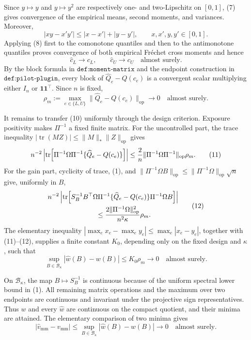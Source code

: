 Since \(y\mapsto y\) and \(y\mapsto y^2\) are respectively one- and two-Lipschitz on \([0,1]\), (7) gives convergence of the empirical means, second moments, and variances.  Moreover,
\[
|xy-x'y'|\le |x-x'|+|y-y'|,
\qquad x,x',y,y'\in[0,1].
\tag{8}
\]
Applying (8) first to the comonotone quantiles and then to the antimonotone quantiles proves convergence of both empirical Fr\'echet cross moments and hence
\[
\widehat c_L\to c_L,
\qquad
\widehat c_U\to c_U
\quad\text{almost surely}.
\tag{9}
\]
By the block formula in \(\texttt{def:moment-matrix}\) and the endpoint construction in \(\texttt{def:pilot-plugin}\), every block of \(\widehat Q_e-Q(c_e)\) is a convergent scalar multiplying either \(I_n\) or \(\mathbf 1\mathbf 1^{\top}\).  Since \(n\) is fixed,
\[
\rho_m:=\max_{e\in\{L,U\}}
\lVert\widehat Q_e-Q(c_e)\rVert_{\mathrm{op}}\longrightarrow0
\quad\text{almost surely}.
\tag{10}
\]

It remains to transfer (10) uniformly through the design criterion.  Exposure positivity makes \(\Pi^{-1}\) a fixed finite matrix.  For the uncontrolled part, the trace inequality \(|\operatorname{tr}(MZ)|\le\lVert M\rVert_*\lVert Z\rVert_{\mathrm{op}}\) gives
\[
n^{-2}\left|
\operatorname{tr}\!\left[\Pi^{-1}\Omega\Pi^{-1}
\{\widehat Q_e-Q(c_e)\}\right]\right|
\le {2\over n}\lVert\Pi^{-1}\Omega\Pi^{-1}\rVert_{\mathrm{op}}\rho_m.
\tag{11}
\]
For the gain part, cyclicity of trace, (1), and
\(\lVert\Pi^{-1}\Omega B\rVert_{\mathrm{op}}\le
\lVert\Pi^{-1}\Omega\rVert_{\mathrm{op}}\sqrt n\) give, uniformly in \(B\),
\[
\begin{split}
&n^{-2}\left|\operatorname{tr}\!\left[
S_B^{-1}B^{\top}\Omega\Pi^{-1}
\{\widehat Q_e-Q(c_e)\}
\Pi^{-1}\Omega B\right]\right|\\
&\hspace{25mm}\le
{2\lVert\Pi^{-1}\Omega\rVert_{\mathrm{op}}^2\over n^2\kappa}\rho_m.
\end{split}
\tag{12}
\]
The elementary inequality
\(\left|\max_e x_e-\max_e y_e\right|\le\max_e|x_e-y_e|\), together with (11)--(12), supplies a finite constant \(K_0\), depending only on the fixed design and \(\kappa\), such that
\[
\sup_{B\in\mathcal B_\kappa}|\widehat w(B)-w(B)|
\le K_0\rho_m\longrightarrow0
\quad\text{almost surely}.
\tag{13}
\]

On \(\mathcal B_\kappa\), the map \(B\mapsto S_B^{-1}\) is continuous because of the uniform spectral lower bound in (1).  All remaining matrix operations and the maximum over two endpoints are continuous and invariant under the projective sign representatives.  Thus \(w\) and every \(\widehat w\) are continuous on the compact quotient, and their minima are attained.  The elementary comparison of two minima gives
\[
|\widehat v_{\mathrm{mm}}-v_{\mathrm{mm}}|
\le\sup_{B\in\mathcal B_\kappa}|\widehat w(B)-w(B)|
\longrightarrow0
\quad\text{almost surely}.
\tag{14}
\]

